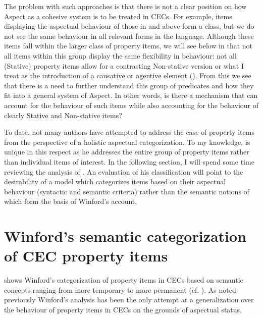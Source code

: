 The problem with such approaches is that there is not a clear position
on how Aspect as a cohesive system is to be treated in CECs.  For
example, items displaying the aspectual behaviour of those in
 and  above form a class, but we do not see
the same behaviour in all relevant forms in the language.  Although
these items fall within the larger class of property items, we will
see below in  that not all items within this group
display the same flexibility in behaviour: not all (Stative) property
items allow for a contrasting Non-stative version or what I treat as
the introduction of a causative or agentive element (). 
From this we see that there is a need to further understand
this group of predicates and how they fit into a general system of
Aspect.  In other words, is there a mechanism that can account for the
behaviour of such items while also accounting for the behaviour of
clearly Stative and Non-stative items?

To date, not many authors have attempted to address the case of
property items from the perspective of a holistic aspectual
categorization.  To my knowledge, \citet{Winford1993} is unique in
this respect as he addresses the entire group of property items rather
than individual items of interest.  In the following section, I will
spend some time reviewing the analysis of \citet{Winford1993}.  An
evaluation of his classification will point to the desirability of a
model which categorizes items based on their aspectual behaviour
(syntactic and semantic criteria) rather than the semantic notions of
\citet{Dixon1977} which form the basis of Winford’s account.
 
\section{Winford’s semantic categorization of CEC property
  items}\label{sec:3.3}

 shows Winford’s categorization of property items
in CECs based on semantic concepts ranging from more temporary to more
permanent (cf. \citealt{Dixon1977}).  As noted previously Winford’s
analysis has been the only attempt at a generalization over the
behaviour of property items in CECs on the grounds of aspectual
status.

